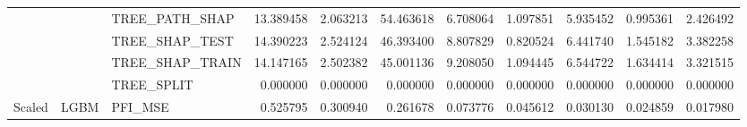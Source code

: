\begin{table}
\begin{tabular}{lllrrrrrrrr}
 &  & TREE\_PATH\_SHAP & {\cellcolor[HTML]{86A9FC}} \color[HTML]{F1F1F1} 13.389458 & {\cellcolor[HTML]{4055C8}} \color[HTML]{F1F1F1} 2.063213 & {\cellcolor[HTML]{B40426}} \color[HTML]{F1F1F1} 54.463618 & {\cellcolor[HTML]{5B7AE5}} \color[HTML]{F1F1F1} 6.708064 & {\cellcolor[HTML]{3B4CC0}} \color[HTML]{F1F1F1} 1.097851 & {\cellcolor[HTML]{5673E0}} \color[HTML]{F1F1F1} 5.935452 & {\cellcolor[HTML]{3B4CC0}} \color[HTML]{F1F1F1} 0.995361 & {\cellcolor[HTML]{4257C9}} \color[HTML]{F1F1F1} 2.426492 \\
 &  & TREE\_SHAP\_TEST & {\cellcolor[HTML]{9EBEFF}} \color[HTML]{000000} 14.390223 & {\cellcolor[HTML]{455CCE}} \color[HTML]{F1F1F1} 2.524124 & {\cellcolor[HTML]{B40426}} \color[HTML]{F1F1F1} 46.393400 & {\cellcolor[HTML]{7295F4}} \color[HTML]{F1F1F1} 8.807829 & {\cellcolor[HTML]{3B4CC0}} \color[HTML]{F1F1F1} 0.820524 & {\cellcolor[HTML]{6180E9}} \color[HTML]{F1F1F1} 6.441740 & {\cellcolor[HTML]{3F53C6}} \color[HTML]{F1F1F1} 1.545182 & {\cellcolor[HTML]{4B64D5}} \color[HTML]{F1F1F1} 3.382258 \\
 &  & TREE\_SHAP\_TRAIN & {\cellcolor[HTML]{9EBEFF}} \color[HTML]{000000} 14.147165 & {\cellcolor[HTML]{445ACC}} \color[HTML]{F1F1F1} 2.502382 & {\cellcolor[HTML]{B40426}} \color[HTML]{F1F1F1} 45.001136 & {\cellcolor[HTML]{7699F6}} \color[HTML]{F1F1F1} 9.208050 & {\cellcolor[HTML]{3B4CC0}} \color[HTML]{F1F1F1} 1.094445 & {\cellcolor[HTML]{6180E9}} \color[HTML]{F1F1F1} 6.544722 & {\cellcolor[HTML]{3E51C5}} \color[HTML]{F1F1F1} 1.634414 & {\cellcolor[HTML]{4961D2}} \color[HTML]{F1F1F1} 3.321515 \\
 &  & TREE\_SPLIT & {\cellcolor[HTML]{3B4CC0}} \color[HTML]{F1F1F1} 0.000000 & {\cellcolor[HTML]{3B4CC0}} \color[HTML]{F1F1F1} 0.000000 & {\cellcolor[HTML]{3B4CC0}} \color[HTML]{F1F1F1} 0.000000 & {\cellcolor[HTML]{3B4CC0}} \color[HTML]{F1F1F1} 0.000000 & {\cellcolor[HTML]{3B4CC0}} \color[HTML]{F1F1F1} 0.000000 & {\cellcolor[HTML]{3B4CC0}} \color[HTML]{F1F1F1} 0.000000 & {\cellcolor[HTML]{3B4CC0}} \color[HTML]{F1F1F1} 0.000000 & {\cellcolor[HTML]{3B4CC0}} \color[HTML]{F1F1F1} 0.000000 \\
\cline{1-11} \cline{2-11}
\multirow[c]{18}{*}{Scaled} & \multirow[c]{9}{*}{LGBM} & PFI\_MSE & {\cellcolor[HTML]{B40426}} \color[HTML]{F1F1F1} 0.525795 & {\cellcolor[HTML]{EAD4C8}} \color[HTML]{000000} 0.300940 & {\cellcolor[HTML]{D7DCE3}} \color[HTML]{000000} 0.261678 & {\cellcolor[HTML]{5D7CE6}} \color[HTML]{F1F1F1} 0.073776 & {\cellcolor[HTML]{4A63D3}} \color[HTML]{F1F1F1} 0.045612 & {\cellcolor[HTML]{4257C9}} \color[HTML]{F1F1F1} 0.030130 & {\cellcolor[HTML]{3E51C5}} \color[HTML]{F1F1F1} 0.024859 & {\cellcolor[HTML]{3B4CC0}} \color[HTML]{F1F1F1} 0.017980 \\

\end{tabular}
\end{table}
